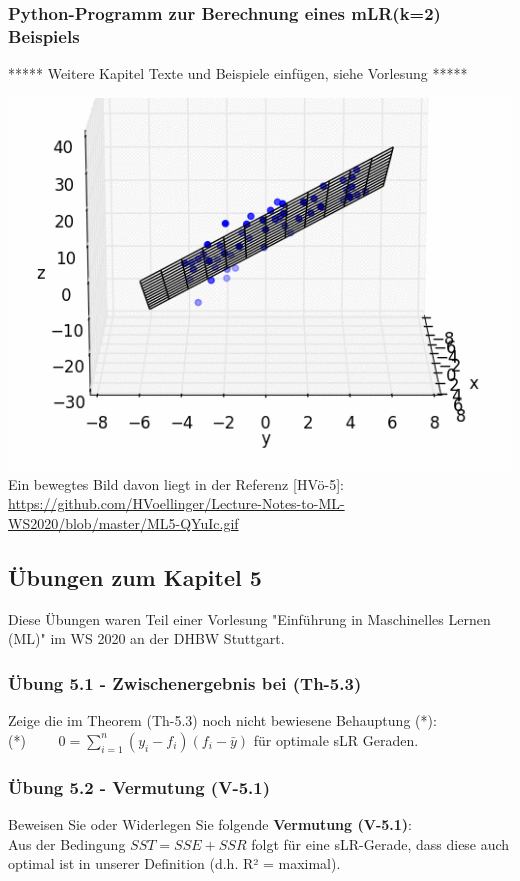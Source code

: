 \documentclass[12pt]{article}
\begin{document}
\subsubsection{Python-Programm zur Berechnung eines mLR(k=2) Beispiels}

{\color{red}
{***** Weitere Kapitel Texte und Beispiele einfügen, siehe Vorlesung *****}}


\includegraphics{ML5-MovingPicture_mLR}\\
%
Ein bewegtes Bild davon liegt in der Referenz [HVö-5]: 
{\url{https://github.com/HVoellinger/Lecture-Notes-to-ML-WS2020/blob/master/ML5-QYuIc.gif}}

\subsection{Übungen zum Kapitel 5}
 
Diese Übungen waren Teil einer Vorlesung "Einführung in Maschinelles  Lernen (ML)" im WS 2020 an der DHBW Stuttgart.

\subsubsection{Übung 5.1 - Zwischenergebnis bei (Th-5.3)}

Zeige die im Theorem (Th-5.3) noch nicht bewiesene Behauptung (*):\\ [0.2cm]
(*) $ \qquad 0 = \sum_{i=1}^{n} (y_i - f_i)(f_i - \bar{y})$ für optimale sLR Geraden. 

\subsubsection{Übung 5.2 - Vermutung (V-5.1)}
Beweisen Sie oder Widerlegen Sie folgende \textbf{Vermutung (V-5.1)}:\\[0.2cm]
Aus der Bedingung $ SST = SSE + SSR $ folgt für eine sLR-Gerade, dass diese auch optimal ist in unserer Definition (d.h. R² = maximal).\\
\end{document}

